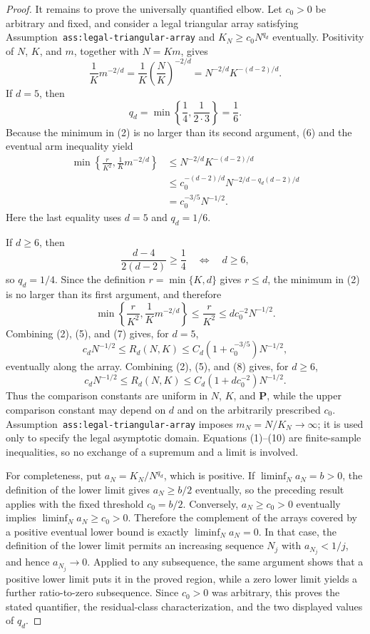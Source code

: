 \documentclass{article}
\begin{document}
\begin{proof}
It remains to prove the universally quantified elbow.  Let \(c_0>0\) be arbitrary and fixed, and consider a legal triangular array satisfying Assumption~\texttt{ass:legal-triangular-array} and \(K_N\ge c_0N^{q_d}\) eventually.  Positivity of \(N\), \(K\), and \(m\), together with \(N=Km\), gives
\[
\frac1K m^{-2/d}
=\frac1K\left(\frac NK\right)^{-2/d}
=N^{-2/d}K^{-(d-2)/d}.
\tag{6}
\]
If \(d=5\), then
\[
q_d=\min\left\{\frac14,\frac1{2\cdot3}\right\}=\frac16.
\]
Because the minimum in (2) is no larger than its second argument, (6) and the eventual arm inequality yield
\[
\begin{aligned}
\min\left\{\frac r{K^2},\frac1K m^{-2/d}\right\}
&\le N^{-2/d}K^{-(d-2)/d}\\
&\le c_0^{-(d-2)/d}
N^{-2/d-q_d(d-2)/d}\\
&=c_0^{-3/5}N^{-1/2}.
\end{aligned}
\tag{7}
\]
Here the last equality uses \(d=5\) and \(q_d=1/6\).

If \(d\ge6\), then
\[
\frac{d-4}{2(d-2)}\ge\frac14
\quad\Longleftrightarrow\quad d\ge6,
\]
so \(q_d=1/4\).  Since the definition \(r=\min\{K,d\}\) gives \(r\le d\), the minimum in (2) is no larger than its first argument, and therefore
\[
\min\left\{\frac r{K^2},\frac1K m^{-2/d}\right\}
\le\frac r{K^2}
\le d c_0^{-2}N^{-1/2}.
\tag{8}
\]
Combining (2), (5), and (7) gives, for \(d=5\),
\[
c_dN^{-1/2}\le R_d(N,K)
\le C_d(1+c_0^{-3/5})N^{-1/2},
\tag{9}
\]
eventually along the array.  Combining (2), (5), and (8) gives, for \(d\ge6\),
\[
c_dN^{-1/2}\le R_d(N,K)
\le C_d(1+d c_0^{-2})N^{-1/2}.
\tag{10}
\]
Thus the comparison constants are uniform in \(N\), \(K\), and \(\mathbf P\), while the upper comparison constant may depend on \(d\) and on the arbitrarily prescribed \(c_0\).  Assumption~\texttt{ass:legal-triangular-array} imposes \(m_N=N/K_N\to\infty\); it is used only to specify the legal asymptotic domain.  Equations (1)--(10) are finite-sample inequalities, so no exchange of a supremum and a limit is involved.

For completeness, put \(a_N=K_N/N^{q_d}\), which is positive.  If \(\liminf_Na_N=b>0\), the definition of the lower limit gives \(a_N\ge b/2\) eventually, so the preceding result applies with the fixed threshold \(c_0=b/2\).  Conversely, \(a_N\ge c_0>0\) eventually implies \(\liminf_Na_N\ge c_0>0\).  Therefore the complement of the arrays covered by a positive eventual lower bound is exactly \(\liminf_Na_N=0\).  In that case, the definition of the lower limit permits an increasing sequence \(N_j\) with \(a_{N_j}<1/j\), and hence \(a_{N_j}\to0\).  Applied to any subsequence, the same argument shows that a positive lower limit puts it in the proved region, while a zero lower limit yields a further ratio-to-zero subsequence.  Since \(c_0>0\) was arbitrary, this proves the stated quantifier, the residual-class characterization, and the two displayed values of \(q_d\).
\end{proof}
\end{document}

